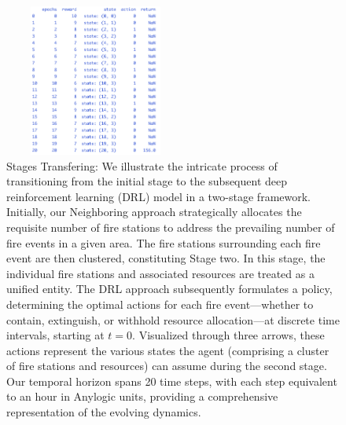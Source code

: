 \documentclass[lettersize,journal]{IEEEtran}
\begin{document}
      
        \begin{figure}
          \centering
          \includegraphics[height=5cm,width=6cm]{figs/4_2000.png}
          \caption{Stages Transfering: We illustrate the intricate process of transitioning from the initial stage to the subsequent deep reinforcement learning (DRL) model in a two-stage framework. Initially, our Neighboring approach strategically allocates the requisite number of fire stations to address the prevailing number of fire events in a given area. The fire stations surrounding each fire event are then clustered, constituting Stage two. In this stage, the individual fire stations and associated resources are treated as a unified entity. The DRL approach subsequently formulates a policy, determining the optimal actions for each fire event—whether to contain, extinguish, or withhold resource allocation—at discrete time intervals, starting at $t=0$. Visualized through three arrows, these actions represent the various states the agent (comprising a cluster of fire stations and resources) can assume during the second stage. Our temporal horizon spans 20 time steps, with each step equivalent to an hour in Anylogic units, providing a comprehensive representation of the evolving dynamics.}\end{figure}
        
        
      











\end{document}
